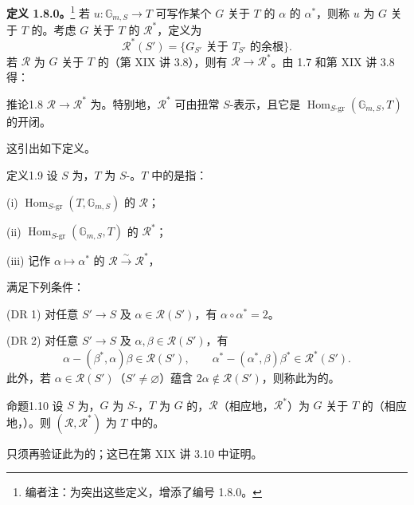 \textbf{定义 1.8.0。}\footnote{编者注：为突出这些定义，增添了编号 1.8.0。} 若 $u:\mathbb G_{m,S}\to T$ 可写作某个 $G$ 关于 $T$ 的 $\alpha$ 的 $\alpha^*$，则称 $u$ 为 $G$ 关于 $T$ 的。考虑 $G$ 关于 $T$ 的 $\mathscr R^*$，定义为
\[\mathscr R^*(S')=\{G_{S'}\text{ 关于 }T_{S'}\text{ 的余根}\}.\]
若 $\mathscr R$ 为 $G$ 关于 $T$ 的（第 XIX 讲 3.8），则有 $\mathscr R\to\mathscr R^*$。由 1.7 和第 XIX 讲 3.8 得：
\begin{SGAresult}{推论}{1.8}  $\mathscr R\to\mathscr R^*$ 为。特别地，$\mathscr R^*$ 可由扭常 $S$-表示，且它是 $\operatorname{Hom}_{S\text{-gr}}(\mathbb G_{m,S},T)$ 的开闭。\end{SGAresult}
这引出如下定义。
\begin{SGAresult}{定义}{1.9}
设 $S$ 为，$T$ 为 $S$-。$T$ 中的是指：

(i) $\operatorname{Hom}_{S\text{-gr}}(T,\mathbb G_{m,S})$ 的 $\mathscr R$；

(ii) $\operatorname{Hom}_{S\text{-gr}}(\mathbb G_{m,S},T)$ 的 $\mathscr R^*$；

(iii) 记作 $\alpha\mapsto\alpha^*$ 的 $\mathscr R\xrightarrow\sim\mathscr R^*$，

满足下列条件：

(DR 1) 对任意 $S'\to S$ 及 $\alpha\in\mathscr R(S')$，有 $\alpha\circ\alpha^*=2$。

(DR 2) 对任意 $S'\to S$ 及 $\alpha,\beta\in\mathscr R(S')$，有
\[\alpha-(\beta^*,\alpha)\beta\in\mathscr R(S'),\qquad\alpha^*-(\alpha^*,\beta)\beta^*\in\mathscr R^*(S').\]
此外，若 $\alpha\in\mathscr R(S')$（$S'\ne\varnothing$）蕴含 $2\alpha\notin\mathscr R(S')$，则称此为的。
\end{SGAresult}
\begin{SGAresult}{命题}{1.10} 设 $S$ 为，$G$ 为 $S$-，$T$ 为 $G$ 的，$\mathscr R$（相应地，$\mathscr R^*$）为 $G$ 关于 $T$ 的（相应地，）。则 $(\mathscr R,\mathscr R^*)$ 为 $T$ 中的。\end{SGAresult}
只须再验证此为的；这已在第 XIX 讲 3.10 中证明。

